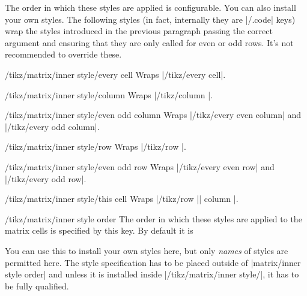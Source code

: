 The order in which these styles are applied is configurable.  You can also
install your own styles.  The following styles (in fact, internally they are
|/.code| keys) wrap the styles introduced in the previous paragraph passing the
correct argument and ensuring that they are only called for even or odd rows.
It's not recommended to override these.

\begin{stylekey}{/tikz/matrix/inner style/every cell}
    Wraps |/tikz/every cell|.
\end{stylekey}
\begin{stylekey}{/tikz/matrix/inner style/column}
    Wraps |/tikz/column |.
\end{stylekey}
\begin{stylekey}{/tikz/matrix/inner style/even odd column}
    Wraps |/tikz/every even column| and |/tikz/every odd column|.
\end{stylekey}
\begin{stylekey}{/tikz/matrix/inner style/row}
    Wraps |/tikz/row |.
\end{stylekey}
\begin{stylekey}{/tikz/matrix/inner style/even odd row}
    Wraps |/tikz/every even row| and |/tikz/every odd row|.
\end{stylekey}
\begin{stylekey}{/tikz/matrix/inner style/this cell}
    Wraps |/tikz/row || column |.
\end{stylekey}

\begin{stylekey}{/tikz/matrix/inner style order}
  The order in which these styles are applied to the matrix cells is specified
  by this key.  By default it is
\begin{codeexample}
\end{codeexample}
  You can use this to install your own styles here, but only \emph{names} of
  styles are permitted here.  The style specification has to be placed
  outside of |matrix/inner style order| and unless it is installed inside
  |/tikz/matrix/inner style/|, it has to be fully qualified.
\begin{codeexample}
\end{codeexample}
\end{stylekey}

